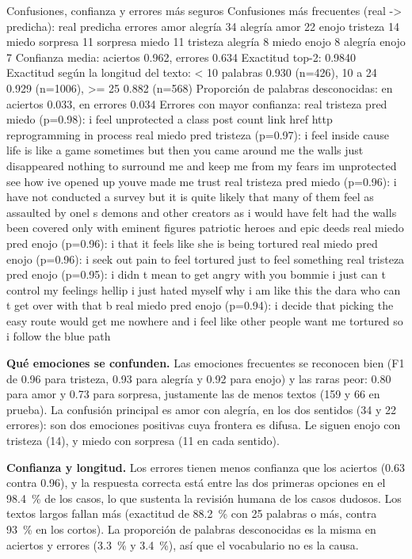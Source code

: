 \documentclass[11pt,letterpaper]{article}
\begin{document}
\begin{consola}[label=out:errores]{Confusiones, confianza y errores más seguros}
Confusiones más frecuentes (real -> predicha):
    real predicha  errores
    amor  alegría       34
 alegría     amor       22
   enojo tristeza       14
   miedo sorpresa       11
sorpresa    miedo       11
tristeza  alegría        8
   miedo    enojo        8
 alegría    enojo        7
Confianza media: aciertos 0.962, errores 0.634
Exactitud top-2: 0.9840
Exactitud según la longitud del texto: < 10 palabras 0.930 (n=426), 10 a 24 0.929 (n=1006), >= 25 0.882 (n=568)
Proporción de palabras desconocidas: en aciertos 0.033, en errores 0.034
Errores con mayor confianza:
  real tristeza  pred miedo     (p=0.98): i feel unprotected a class post count link href http reprogramming in process
  real miedo     pred tristeza  (p=0.97): i feel inside cause life is like a game sometimes but then you came around me the walls just disappeared nothing to surround me and keep me from my fears im unprotected see how ive opened up youve made me trust
  real tristeza  pred miedo     (p=0.96): i have not conducted a survey but it is quite likely that many of them feel as assaulted by onel s demons and other creators as i would have felt had the walls been covered only with eminent figures patriotic heroes and epic deeds
  real miedo     pred enojo     (p=0.96): i that it feels like she is being tortured
  real miedo     pred enojo     (p=0.96): i seek out pain to feel tortured just to feel something
  real tristeza  pred enojo     (p=0.95): i didn t mean to get angry with you bommie i just can t control my feelings hellip i just hated myself why i am like this the dara who can t get over with that b
  real miedo     pred enojo     (p=0.94): i decide that picking the easy route would get me nowhere and i feel like other people want me tortured so i follow the blue path
\end{consola}

\textbf{Qué emociones se confunden.} Las emociones frecuentes se reconocen bien (F1 de 0.96 para tristeza, 0.93 para alegría y 0.92 para enojo) y las raras peor: 0.80 para amor y 0.73 para sorpresa, justamente las de menos textos (159 y 66 en prueba). La confusión principal es amor con alegría, en los dos sentidos (34 y 22 errores): son dos emociones positivas cuya frontera es difusa. Le siguen enojo con tristeza (14), y miedo con sorpresa (11 en cada sentido).

\textbf{Confianza y longitud.} Los errores tienen menos confianza que los aciertos (0.63 contra 0.96), y la respuesta correcta está entre las dos primeras opciones en el 98.4~\% de los casos, lo que sustenta la revisión humana de los casos dudosos. Los textos largos fallan más (exactitud de 88.2~\% con 25 palabras o más, contra 93~\% en los cortos). La proporción de palabras desconocidas es la misma en aciertos y errores (3.3~\% y 3.4~\%), así que el vocabulario no es la causa.
\end{document}

